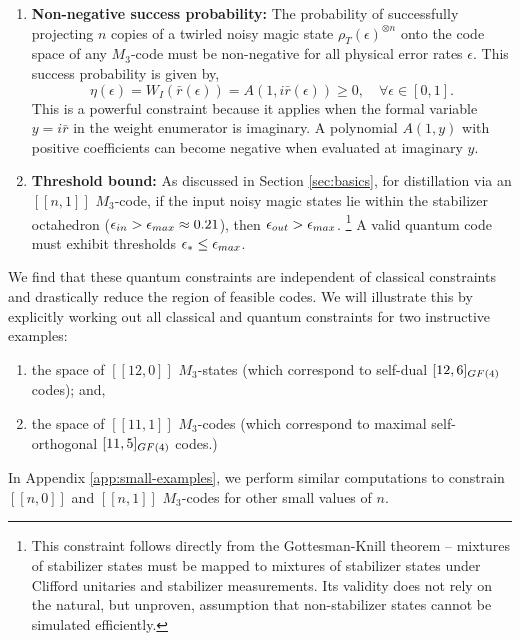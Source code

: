 \documentclass[11pt]{article}
\begin{document}
\begin{enumerate}
    \item \textbf{Non-negative success probability:} The probability of successfully projecting $n$ copies of a twirled  noisy magic state $\rho_T(\epsilon)^{\otimes n}$ onto the code space of any $M_3$-code must be non-negative for all physical error rates $\epsilon$. This success probability is given by,
    \begin{equation}
        \eta(\epsilon) = W_I(\bar{r}(\epsilon)) = A(1, i\bar{r}(\epsilon)) \geq 0, \quad \forall \epsilon \in [0, 1].
    \end{equation}
    This is a powerful constraint because it applies when the formal variable $y=i\bar{r}$ in the weight enumerator is imaginary. A polynomial $A(1, y)$ with positive coefficients can become negative when evaluated at imaginary $y$.

    \item \textbf{Threshold bound:} As discussed in Section \ref{sec:basics}, for distillation via an $[[n,1]]$ $M_3$-code, if the input noisy magic states lie within the stabilizer octahedron ($\epsilon_{\rm in} > \epsilon_{\rm max} \approx 0.21$), then $\epsilon_{\rm out}>\epsilon_{\rm max}$. \footnote{This constraint follows directly from the Gottesman-Knill theorem -- mixtures of stabilizer states must be mapped to mixtures of stabilizer states under Clifford unitaries and stabilizer measurements. Its validity does not rely on the natural, but unproven, assumption that non-stabilizer states cannot be simulated efficiently. } A valid quantum code must exhibit thresholds $\epsilon_* \leq \epsilon_{\rm max}$.
\end{enumerate}

We find that these quantum constraints are independent of classical constraints and drastically reduce the region of feasible codes. We will illustrate this by explicitly working out all classical and quantum constraints for two instructive examples:
\begin{enumerate}
    \item the space of $[[12,0]]$ $M_3$-states (which correspond to self-dual $[12,6]_{\rm GF(4)}$ codes); and, 
    \item the space of $[[11,1]]$ $M_3$-codes (which correspond to maximal self-orthogonal $[11,5]_{\rm GF(4)}$ codes.)
\end{enumerate}
In Appendix \ref{app:small-examples}, we perform similar computations to constrain $[[n,0]]$ and $[[n,1]]$ $M_3$-codes for other small values of $n$.
\end{document}
